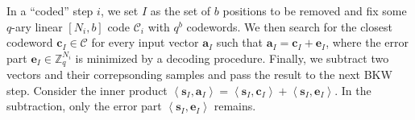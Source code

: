In a ``coded'' step $i$, we set $I$ as the set of $b$ positions to be removed and fix some $q$-ary linear $\left[N_i, b\right]$ code $\mathcal{C}_i$ with $q^b$ codewords. We then search for the closest codeword $\mathbf{c}_I \in \mathcal{C}$ for every input vector $\mathbf{a}_I$ such that $\mathbf{a}_I = \mathbf{c}_I + \mathbf{e}_I$, where the error part $\mathbf{e}_I \in \mathbb{Z}_q^{N_i}$ is minimized by a decoding procedure. Finally, we subtract two vectors and their correpsonding samples and pass the result to the next BKW step. Consider the inner product $\left\langle \mathbf{s}_{I}, \mathbf{a}_{I} \right\rangle = \left\langle \mathbf{s}_{I}, \mathbf{c}_{I} \right\rangle + \left\langle \mathbf{s}_{I}, \mathbf{e}_{I} \right\rangle$. In the subtraction, only the error part $\left\langle \mathbf{s}_{I}, \mathbf{e}_{I} \right\rangle$ remains. %










